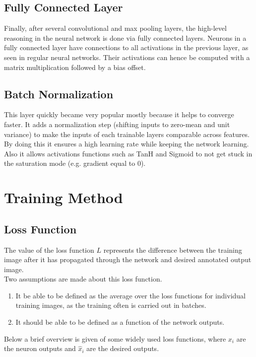     \subsection{Fully Connected Layer}
    Finally, after several convolutional and max pooling layers, the high-level reasoning in the neural network is done via fully connected layers. Neurons in a fully connected layer have connections to all activations in the previous layer, as seen in regular neural networks. Their activations can hence be computed with a matrix multiplication followed by a bias offset. 

    \subsection{Batch Normalization}
    This layer quickly became very popular mostly because it helps to converge faster\cite{ioffe2015batch}. It adds a normalization step (shifting inputs to zero-mean and unit variance) to make the inputs of each trainable layers comparable across features. By doing this it ensures a high learning rate while keeping the network learning. \\

    Also it allows activations functions such as TanH and Sigmoid to not get stuck in the saturation mode (e.g. gradient equal to $0$).

    \section{Training Method}
    \subsection{Loss Function}
    The value of the loss function $L$ represents the difference between the training image after it has propagated through the network and desired annotated output image.\\ 

    Two assumptions are made about this loss function. 
    \begin{enumerate}
        \item It be able to be defined as the average over the loss functions for individual training images, as the training often is carried out in batches.
        \item It should be able to be defined as a function of the network outputs. 
    \end{enumerate}

    Below a brief overview is given of some widely used loss functions, where $x_i$ are the neuron outputs and $\hat{x}_i$ are the desired outputs.
